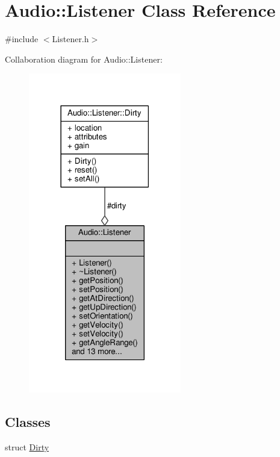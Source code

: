 \hypertarget{classAudio_1_1Listener}{}\section{Audio\+:\+:Listener Class Reference}
\label{classAudio_1_1Listener}


{\ttfamily \#include $<$Listener.\+h$>$}



Collaboration diagram for Audio\+:\+:Listener\+:
\nopagebreak
\begin{figure}[H]
\begin{center}
\leavevmode
\includegraphics[width=189pt]{dd/dab/classAudio_1_1Listener__coll__graph}
\end{center}
\end{figure}
\subsection*{Classes}
\begin{DoxyCompactItemize}
\item 
struct \hyperlink{structAudio_1_1Listener_1_1Dirty}{Dirty}
\end{DoxyCompactItemize}
